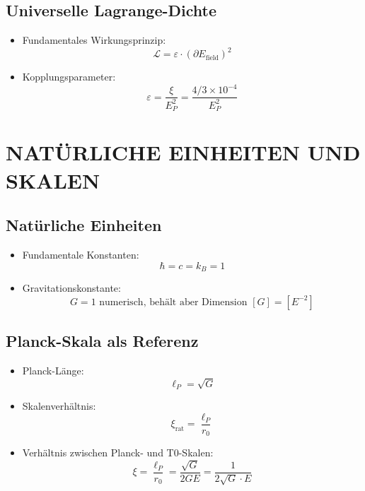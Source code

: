 \documentclass[12pt,a4paper]{article}
\begin{document}
	\subsection{Universelle Lagrange-Dichte}
	\begin{itemize}
		\item Fundamentales Wirkungsprinzip:
		$$\boxed{\mathcal{L} = \varepsilon \cdot (\partial E_{\text{field}})^2}$$
		
		\item Kopplungsparameter:
		$$\varepsilon = \frac{\xi}{E_P^2} = \frac{4/3 \times 10^{-4}}{E_P^2}$$
	\end{itemize}
	
	\section{NAT\"{U}RLICHE EINHEITEN UND SKALEN}
	
	\subsection{Nat\"{u}rliche Einheiten}
	\begin{itemize}
		\item Fundamentale Konstanten:
		$$\hbar = c = k_B = 1$$
		
		\item Gravitationskonstante:
		$$G = 1 \text{ numerisch, beh\"{a}lt aber Dimension } [G] = [E^{-2}]$$
	\end{itemize}
	
	\subsection{Planck-Skala als Referenz}
	\begin{itemize}
		\item Planck-L\"{a}nge:
		$$\ell_P = \sqrt{G}$$
		
		\item Skalenverh\"{a}ltnis:
		$$\xi_{\text{rat}} = \frac{\ell_P}{r_0}$$
		
		\item Verh\"{a}ltnis zwischen Planck- und T0-Skalen:
		$$\xi = \frac{\ell_P}{r_0} = \frac{\sqrt{G}}{2GE} = \frac{1}{2\sqrt{G} \cdot E}$$
	\end{itemize}
	
\end{document}
